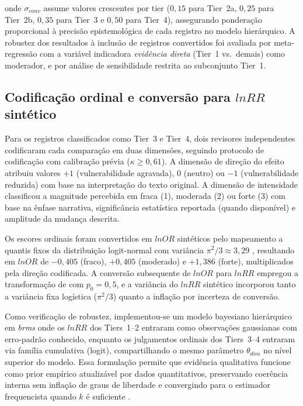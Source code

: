 \noindent onde $\sigma_{conv}$ assume valores crescentes por tier ($0{,}15$ para Tier~2a, $0{,}25$ para Tier~2b, $0{,}35$ para Tier~3 e $0{,}50$ para Tier~4), assegurando ponderação proporcional à precisão epistemológica de cada registro no modelo hierárquico. A robustez dos resultados à inclusão de registros convertidos foi avaliada por meta-regressão com a variável indicadora \textit{evidência direta} (Tier~1 vs.~demais) como moderador, e por análise de sensibilidade restrita ao subconjunto Tier~1.

\subsection{Codificação ordinal e conversão para $lnRR$ sintético}
\label{sec:coding_cap2}

Para os registros classificados como Tier~3 e Tier~4, dois revisores independentes codificaram cada comparação em duas dimensões, seguindo protocolo de codificação com calibração prévia ($\kappa \geq 0{,}61$). A dimensão de direção do efeito atribuiu valores $+1$ (vulnerabilidade agravada), $0$ (neutro) ou $-1$ (vulnerabilidade reduzida) com base na interpretação do texto original. A dimensão de intensidade classificou a magnitude percebida em fraca (1), moderada (2) ou forte (3) com base na ênfase narrativa, significância estatística reportada (quando disponível) e amplitude da mudança descrita.

Os escores ordinais foram convertidos em $lnOR$ sintéticos pelo mapeamento a quantis fixos da distribuição logit-normal com variância $\pi^2/3 \approx 3{,}29$ \cite{Hasselblad1995}, resultando em $lnOR$ de $-0{,}405$ (fraco), $+0{,}405$ (moderado) e $+1{,}386$ (forte), multiplicados pela direção codificada. A conversão subsequente de $lnOR$ para $lnRR$ empregou a transformação de  com $p_0 = 0{,}5$, e a variância do $lnRR$ sintético incorporou tanto a variância fixa logística ($\pi^2/3$) quanto a inflação por incerteza de conversão.

Como verificação de robustez, implementou-se um modelo bayesiano hierárquico em \textit{brms} \cite{Burkner2017} onde os $lnRR$ dos Tiers~1--2 entraram como observações gaussianas com erro-padrão conhecido, enquanto os julgamentos ordinais dos Tiers~3--4 entraram via família cumulativa (logit), compartilhando o mesmo parâmetro $\theta_{dim}$ no nível superior do modelo. Essa formulação permite que evidência qualitativa funcione como prior empírico atualizável por dados quantitativos, preservando coerência interna sem inflação de graus de liberdade e convergindo para o estimador frequencista quando $k$ é suficiente \cite{Rover2020}.

